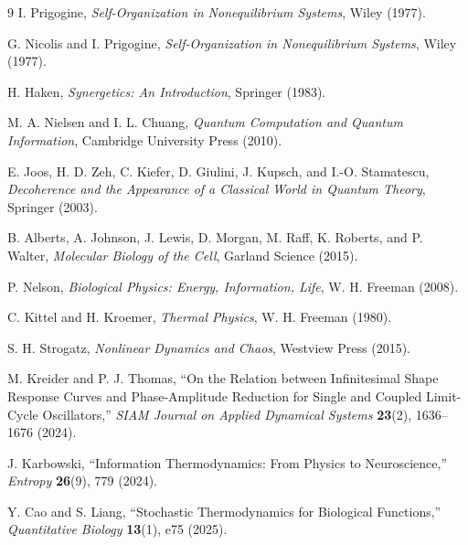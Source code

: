 \documentclass[11pt,a4paper]{article}
\begin{document}
\begin{thebibliography}{9}
I. Prigogine,
\emph{Self-Organization in Nonequilibrium Systems},
Wiley (1977).

G. Nicolis and I. Prigogine,
\emph{Self-Organization in Nonequilibrium Systems},
Wiley (1977).

H. Haken,
\emph{Synergetics: An Introduction},
Springer (1983).

M. A. Nielsen and I. L. Chuang,
\emph{Quantum Computation and Quantum Information},
Cambridge University Press (2010).

E. Joos, H. D. Zeh, C. Kiefer, D. Giulini, J. Kupsch, and I.-O. Stamatescu,
\emph{Decoherence and the Appearance of a Classical World in Quantum Theory},
Springer (2003).

B. Alberts, A. Johnson, J. Lewis, D. Morgan, M. Raff, K. Roberts, and P. Walter,
\emph{Molecular Biology of the Cell},
Garland Science (2015).

P. Nelson,
\emph{Biological Physics: Energy, Information, Life},
W. H. Freeman (2008).

C. Kittel and H. Kroemer,
\emph{Thermal Physics},
W. H. Freeman (1980).

S. H. Strogatz,
\emph{Nonlinear Dynamics and Chaos},
Westview Press (2015).

M. Kreider and P. J. Thomas,
``On the Relation between Infinitesimal Shape Response Curves and Phase-Amplitude Reduction for Single and Coupled Limit-Cycle Oscillators,''
\emph{SIAM Journal on Applied Dynamical Systems} \textbf{23}(2), 1636--1676 (2024).

J. Karbowski,
``Information Thermodynamics: From Physics to Neuroscience,''
\emph{Entropy} \textbf{26}(9), 779 (2024).

Y. Cao and S. Liang,
``Stochastic Thermodynamics for Biological Functions,''
\emph{Quantitative Biology} \textbf{13}(1), e75 (2025).
\end{thebibliography}
\end{document}
